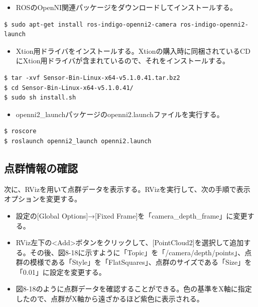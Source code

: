\begin{itemize}
\item ROSのOpenNI関連パッケージをダウンロードしてインストールする。
\end{itemize}

\begin{lstlisting}[language=ROS]
$ sudo apt-get install ros-indigo-openni2-camera ros-indigo-openni2-launch
\end{lstlisting}

\begin{itemize}
\item Xtion用ドライバをインストールする。Xtionの購入時に同梱されているCDにXtion用ドライバが含まれているので、それをインストールする。
\end{itemize}

\begin{lstlisting}[language=ROS]
$ tar -xvf Sensor-Bin-Linux-x64-v5.1.0.41.tar.bz2
$ cd Sensor-Bin-Linux-x64-v5.1.0.41/
$ sudo sh install.sh
\end{lstlisting}

\begin{itemize}
\item openni2\_launchパッケージのopenni2.launchファイルを実行する。
\end{itemize}

\begin{lstlisting}[language=ROS]
$ roscore
$ roslaunch openni2_launch openni2.launch
\end{lstlisting}

\subsection{点群情報の確認}

次に、RVizを用いて点群データを表示する。RVizを実行して、次の手順で表示オプションを変更する。

\begin{itemize}
\item 設定の[Global Options]→[Fixed Frame]を「camera\_depth\_frame」に変更する。
\item RViz左下の<Add>ボタンをクリックして、[PointCloud2]を選択して追加する。その後、図8-18に示すように「Topic」を「/camera/depth/points」、点群の模様である「Style」を「FlatSquares」、点群のサイズである「Size」を「0.01」に設定を変更する。
\item 図8-18のように点群データを確認することができる。色の基準をX軸に指定したので、点群がX軸から遠ざかるほど紫色に表示される。
\end{itemize}

